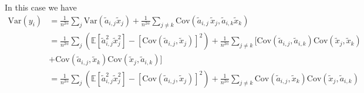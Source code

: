 \documentclass{article}
\begin{document}
In this case we have
\begin{align}
\textrm{Var}(y_i) 
&= \frac1{n^{2\alpha}}\sum_{j}\textrm{Var}\left(  \tilde{a}_{i,j}\tilde{x}_j\right) 
+ \frac1{n^{2\alpha}}\sum_{j\neq k}\textrm{Cov}\left( \tilde{a}_{i,j}\,\tilde{x}_j, \tilde{a}_{i,k}\tilde{x}_k\right)\\
&=
\frac1{n^{2\alpha}}\sum_{j}
\left(
\mathbb E[\tilde a_{i,j}^2\tilde x_j^2]
- \left[\textrm{Cov}(\tilde a_{i,j},\tilde x_j)\right]^2
\right)
+ \frac1{n^{2\alpha}}\sum_{j\neq k}
\Big[
\textrm{Cov}\left( \tilde{a}_{i,j}, \tilde{a}_{i,k}\right) 
\textrm{Cov}\left( \tilde{x}_j, \tilde{x}_k\right)\nonumber\\
&+
\textrm{Cov}\left( \tilde{a}_{i,j}, \tilde{x}_k\right) 
\textrm{Cov}\left( \tilde{x}_j,  \tilde{a}_{i,k}\right)
\Big]\\
&=
\frac1{n^{2\alpha}}\sum_{j}
\left(
\mathbb E[\tilde a_{i,j}^2\tilde x_j^2]
- \left[\textrm{Cov}(\tilde a_{i,j},\tilde x_j)\right]^2
\right)
+ \frac1{n^{2\alpha}}\sum_{j\neq k}
\textrm{Cov}\left( \tilde{a}_{i,j}, \tilde{x}_k\right) 
\textrm{Cov}\left( \tilde{x}_j,  \tilde{a}_{i,k}\right)
\end{align}
\end{document}
